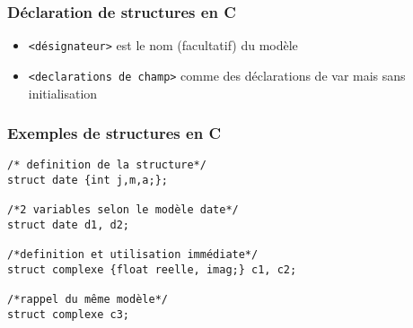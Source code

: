 \documentclass[table,handout,tikz,12pt,svgnames]{beamer}
\begin{document}
\begin{frame}[fragile=singleslide]
	\frametitle{Déclaration de structures en C}
	\begin{itemize}
		où:
		\item \texttt{<désignateur>} est le nom (facultatif) du modèle
		\item \texttt{<declarations de champ>} comme des déclarations de var mais sans initialisation
	\end{itemize}
\end{frame}


\begin{frame}[fragile=singleslide]
	\frametitle{Exemples de structures en C}
	\begin{verbatim} 
/* definition de la structure*/
struct date {int j,m,a;}; 

/*2 variables selon le modèle date*/
struct date d1, d2;

/*definition et utilisation immédiate*/
struct complexe {float reelle, imag;} c1, c2;

/*rappel du même modèle*/
struct complexe c3;
	\end{verbatim}
\end{frame}

\end{document}

